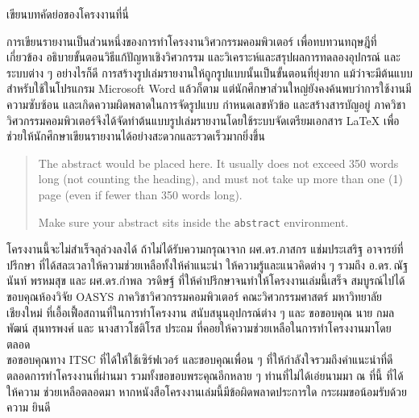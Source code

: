 \maketitle
\makesignature

\ifproject
\begin{abstractTH}
เขียนบทคัดย่อของโครงงานที่นี่

การเขียนรายงานเป็นส่วนหนึ่งของการทำโครงงานวิศวกรรมคอมพิวเตอร์
เพื่อทบทวนทฤษฎีที่เกี่ยวข้อง อธิบายขั้นตอนวิธีแก้ปัญหาเชิงวิศวกรรม และวิเคราะห์และสรุปผลการทดลองอุปกรณ์ และระบบต่าง ๆ
\enskip อย่างไรก็ดี การสร้างรูปเล่มรายงานให้ถูกรูปแบบนั้นเป็นขั้นตอนที่ยุ่งยาก
แม้ว่าจะมีต้นแบบสำหรับใช้ในโปรแกรม Microsoft Word แล้วก็ตาม
แต่นักศึกษาส่วนใหญ่ยังคงค้นพบว่าการใช้งานมีความซับซ้อน และเกิดความผิดพลาดในการจัดรูปแบบ กำหนดเลขหัวข้อ และสร้างสารบัญอยู่
\enskip ภาควิชาวิศวกรรมคอมพิวเตอร์จึงได้จัดทำต้นแบบรูปเล่มรายงานโดยใช้ระบบจัดเตรียมเอกสาร
\LaTeX{} เพื่อช่วยให้นักศึกษาเขียนรายงานได้อย่างสะดวกและรวดเร็วมากยิ่งขึ้น
\end{abstractTH}

\begin{abstract}
The abstract would be placed here. It usually does not exceed 350 words
long (not counting the heading), and must not take up more than one (1) page
(even if fewer than 350 words long).

Make sure your abstract sits inside the \texttt{abstract} environment.
\end{abstract}

\iffalse
\begin{dedication}
This document is dedicated to all Chiang Mai University students.

Dedication page is optional.
\end{dedication}
\fi %

\begin{acknowledgments}
\indent โครงงานนี้จะไม่สำเร็จลุล่วงลงได้ ถ้าไม่ได้รับความกรุณาจาก ผศ.ดร.ภาสกร แช่มประเสริฐ
อาจารย์ที่ปรึกษา ที่ได้สละเวลาให้ความช่วยเหลือทั้งให้คำแนะนำ ให้ความรู้และแนวคิดต่าง ๆ รวมถึง
อ.ดร.\,ณัฐนันท์ พรหมสุข และ ผศ.ดร.กำพล วรดิษฐ์ ที่ให้คำปรึกษาจนทำให้โครงงานเล่มนี้เสร็จ
สมบูรณ์ไปได้ \\
\indent ขอบคุณห้องวิจัย OASYS ภาควิชาวิศวกรรมคอมพิวเตอร์ คณะวิศวกรรมศาสตร์
มหาวิทยาลัยเชียงใหม่ ที่เอื้อเฟื้อสถานที่ในการทำโครงงาน สนับสนุนอุปกรณ์ต่าง ๆ และ
ขอขอบคุณ นาย กมลพัฒน์ สุนทรพงศ์ และ นางสาวโชติโรส ประถม ที่คอยให้ความช่วยเหลือในการทำโครงงานมาโดยตลอด \\
\indent ขอขอบคุณทาง ITSC ที่ได้ให้ใช้เซิร์ฟเวอร์ และขอบคุณเพื่อน ๆ ที่ให้กำลังใจรวมถึงคำแนะนำที่ดีตลอดการทำโครงงานที่ผ่านมา 
รวมทั้งขอขอบพระคุณอีกหลาย ๆ ท่านที่ไม่ได้เอ่ยนามมา ณ ที่นี้ ที่ได้ให้ความ
ช่วยเหลือตลอดมา หากหนังสือโครงงานเล่มนี้มีข้อผิดพลาดประการใด กระผมขอน้อมรับด้วยความ
ยินดี



\end{acknowledgments}%
\fi %

\contentspage

\ifproject

\fi %



